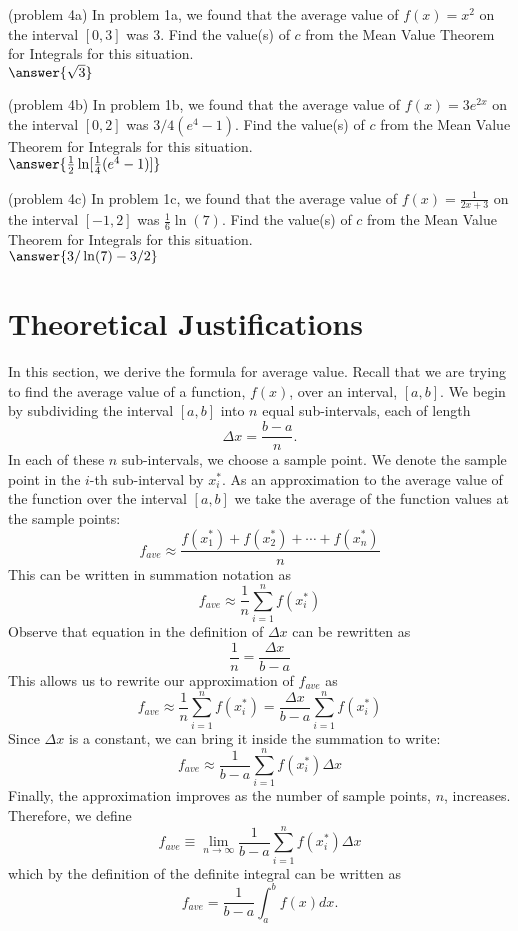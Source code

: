\documentclass[handout]{ximera}
\begin{document}
\begin{problem}(problem 4a)
In problem 1a, we found that the average value of $f(x) = x^2$ on the interval $[0,3]$ was 3.
Find the value(s) of $c$ from the Mean Value Theorem for Integrals for this situation.\\
$\answer{\sqrt 3}$
\end{problem}

\begin{problem}(problem 4b)
In problem 1b, we found that the average value of $f(x) = 3e^{2x}$ on the interval $[0,2]$ was $3/4 (e^4 - 1)$.
Find the value(s) of $c$ from the Mean Value Theorem for Integrals for this situation.\\
$\answer{\frac12 \ln[\frac14(e^4 -1)]}$
\end{problem}

\begin{problem}(problem 4c)
In problem 1c, we found that the average value of $f(x) = \frac{1}{2x+3}$ on the interval $[-1, 2]$ was $\frac16 \ln(7)$.
Find the value(s) of $c$ from the Mean Value Theorem for Integrals for this situation.\\
$\answer{3/\ln(7) - 3/2}$
\end{problem}

\begin{center}
\begin{foldable}
\end{foldable}
\end{center}


\section{Theoretical Justifications}

In this section, we derive the formula for average value. Recall that we are trying to find the average value of a function, $f(x)$, over an interval, $[a,b]$.
We begin by subdividing the interval $[a,b]$ into $n$ equal sub-intervals, each of length
\[
\Delta x = \frac{b-a}{n}.
\]
In each of these $n$ sub-intervals, we choose a sample point.  We denote the sample point in the $i$-th sub-interval by $x_i^*$.
As an approximation to the average value of the function over the interval $[a,b]$ we take the average of the function values at the sample points:
\[
f_{ave} \approx \frac{f(x_1^*) + f(x_2^*)+ \cdots +f(x_n^*)}{n}
\]
This can be written in summation notation as 
\[
f_{ave} \approx \frac{1}{n} \sum_{i=1}^n f(x_i^*)
\]
Observe that equation in the definition of $\Delta x$ can be rewritten as 
\[
\frac{1}{n} = \frac{\Delta x}{b-a}
\]
This allows us to rewrite our approximation of $f_{ave}$ as
\[
f_{ave} \approx \frac{1}{n} \sum_{i=1}^n f(x_i^*) = \frac{\Delta x}{b-a} \sum_{i=1}^n f(x_i^*)
\]
Since $\Delta x$ is a constant, we can bring it inside the summation to write:
\[
f_{ave} \approx  \frac{1}{b-a} \sum_{i=1}^n f(x_i^*)\Delta x
\]
Finally, the approximation improves as the number of sample points, $n$, increases. Therefore, we define
\[
f_{ave} \equiv \lim_{n \to \infty} \frac{1}{b-a} \sum_{i=1}^n f(x_i^*)\Delta x
\]
which by the definition of the definite integral can be written as
\[
f_{ave} = \frac{1}{b-a} \int_a^b f(x) dx.
\]
\end{document}
